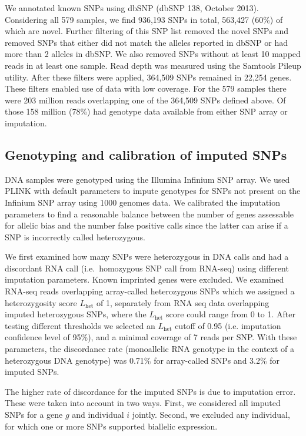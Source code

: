 \documentclass[letterpaper]{article}
\begin{document}
We annotated known SNPs using dbSNP (dbSNP 138, October 2013). Considering all
579 samples, we find 936,193 SNPs in total, 563,427 (60\%) of which are novel.
Further filtering of this SNP list removed the novel SNPs and removed SNPs
that either did not match the alleles reported in dbSNP or had more than 2
alleles in dbSNP. We also removed SNPs without at least 10 mapped reads in at
least one sample. Read depth was measured using the Samtools Pileup utility.
After these filters were applied, 364,509 SNPs remained in 22,254 genes. These
filters enabled use of data with low coverage.  For the 579
samples there were 203 million reads overlapping one of the
364,509 SNPs defined above.  Of those 158 million (78\%) had genotype data
available from either SNP array or imputation.

\subsection{Genotyping and calibration of imputed SNPs}

DNA samples were genotyped using the Illumina Infinium SNP array. We used
PLINK with default parameters to impute genotypes for SNPs not present on the
Infinium SNP array using 1000 genomes data.  We calibrated the
imputation parameters to find a reasonable balance between the number of genes
assessable for allelic bias and the number false positive
calls since the latter can arise if a SNP is
incorrectly called heterozygous.

We first examined how many SNPs were heterozygous in DNA calls and had a
discordant RNA call (i.e.~homozygous SNP call from RNA-seq) using different imputation
parameters. Known imprinted genes were excluded. We examined RNA-seq reads
overlapping array-called heterozygous SNPs which we assigned a heterozygosity
score \(L_\mathrm{het}\) of 1, separately from RNA seq data
overlapping imputed heterozygous SNPs, where the \(L_\mathrm{het}\) score could
range from 0 to 1.  After testing different thresholds
we selected an \(L_\mathrm{het}\) cutoff of 0.95 (i.e. imputation confidence
level of 95\%), and a minimal coverage of 7 reads per SNP. With these
parameters, the discordance rate (monoallelic RNA genotype in the context of a
heterozygous DNA genotype) was 0.71\% for array-called SNPs and 3.2\% for
imputed SNPs.

The higher rate of discordance for the imputed SNPs
is due to imputation error.  These were taken into
account in two ways.
First, we considered all imputed SNPs for a gene \(g\) and individual \(i\)
jointly.  Second, we excluded
any individual, for which one or more SNPs supported biallelic
expression.
\end{document}
